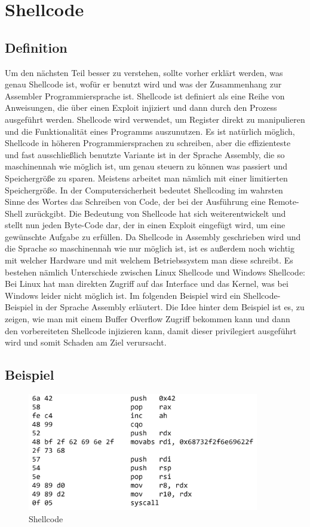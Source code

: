\section{Shellcode}
\subsection{Definition}
Um den nächsten Teil besser zu verstehen, sollte vorher erklärt werden, was genau Shellcode ist, wofür er 
benutzt wird und was der Zusammenhang zur Assembler Programmiersprache ist. Shellcode ist definiert als eine 
Reihe von Anweisungen, die über einen Exploit injiziert und dann durch den Prozess ausgeführt werden.
Shellcode wird verwendet, um Register direkt zu manipulieren und die Funktionalität eines Programms auszunutzen. 
Es ist natürlich möglich, Shellcode in höheren Programmiersprachen zu schreiben, aber die effizienteste und fast 
ausschließlich benutzte Variante ist in der Sprache Assembly, die so maschinennah wie möglich ist, um genau steuern 
zu können was passiert und Speichergröße zu sparen. Meistens arbeitet man nämlich mit einer limitierten Speichergröße.
In der Computersicherheit bedeutet Shellcoding im wahrsten Sinne des Wortes das Schreiben von Code, der bei der
Ausführung eine Remote-Shell zurückgibt. Die Bedeutung von Shellcode hat sich weiterentwickelt und stellt nun jeden
Byte-Code dar, der in einen Exploit eingefügt wird, um eine gewünschte Aufgabe zu erfüllen. Da Shellcode in Assembly
geschrieben wird und die Sprache so maschinennah wie nur möglich ist, ist es außerdem noch wichtig mit welcher
Hardware und mit welchem Betriebssystem man diese schreibt. Es bestehen nämlich Unterschiede zwischen Linux
Shellcode und Windows Shellcode:  Bei Linux hat man direkten Zugriff auf das Interface und das Kernel, was bei
Windows leider nicht möglich ist. Im folgenden Beispiel wird ein Shellcode-Beispiel in der Sprache Assembly erläutert.
Die Idee hinter dem Beispiel ist es, zu zeigen, wie man mit einem Buffer Overflow Zugriff bekommen kann und dann den
vorbereiteten Shellcode injizieren kann, damit dieser privilegiert ausgeführt wird und somit Schaden am Ziel verursacht.

\subsection{Beispiel}
\begin{figure}[h]
    \centering
    \includegraphics[width=0.9\textwidth,height=0.75\textheight,keepaspectratio]{images/shellstorm.png}
    \caption{Shellcode}
\end{figure}

